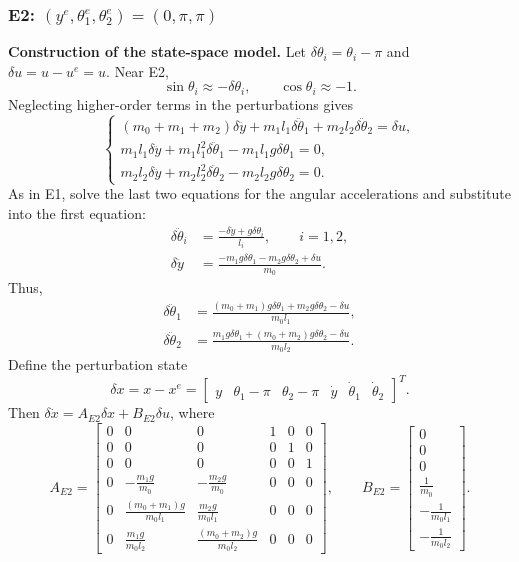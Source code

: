 \documentclass[12pt,a4paper]{article}
\begin{document}
\subsubsection*{E2: $(y^e,\theta_1^e,\theta_2^e)=(0,\pi,\pi)$}
\textbf{Construction of the state-space model.}
Let $\delta\theta_i=\theta_i-\pi$ and $\delta u=u-u^e=u$.
Near E2,
\[
\sin\theta_i\approx-\delta\theta_i,\qquad
\cos\theta_i\approx-1.
\]
Neglecting higher-order terms in the perturbations gives
\[
\begin{cases}
(m_0+m_1+m_2)\delta\ddot y
 +m_1l_1\delta\ddot\theta_1+m_2l_2\delta\ddot\theta_2=\delta u,\\
m_1l_1\delta\ddot y+m_1l_1^2\delta\ddot\theta_1
 -m_1l_1g\delta\theta_1=0,\\
m_2l_2\delta\ddot y+m_2l_2^2\delta\ddot\theta_2
 -m_2l_2g\delta\theta_2=0.
\end{cases}
\]
As in E1, solve the last two equations for the angular accelerations
and substitute into the first equation:
\begin{align*}
\delta\ddot\theta_i&=\frac{-\delta\ddot y+g\delta\theta_i}{l_i},
\qquad i=1,2,\\
\delta\ddot y&=\frac{-m_1g\delta\theta_1-m_2g\delta\theta_2+\delta u}{m_0}.
\end{align*}
Thus,
\begin{align*}
\delta\ddot\theta_1
 &=\frac{(m_0+m_1)g\delta\theta_1+m_2g\delta\theta_2-\delta u}{m_0l_1},\\
\delta\ddot\theta_2
 &=\frac{m_1g\delta\theta_1+(m_0+m_2)g\delta\theta_2-\delta u}{m_0l_2}.
\end{align*}
Define the perturbation state
\[
\delta x=x-x^e=
\begin{bmatrix}
y&\theta_1-\pi&\theta_2-\pi&\dot y&\dot\theta_1&\dot\theta_2
\end{bmatrix}^{T}.
\]
Then $\delta\dot x=A_{E2}\delta x+B_{E2}\delta u$, where
\[
A_{E2}=\begin{bmatrix}
0&0&0&1&0&0\\
0&0&0&0&1&0\\
0&0&0&0&0&1\\
0&-\frac{m_1g}{m_0}&-\frac{m_2g}{m_0}&0&0&0\\
0&\frac{(m_0+m_1)g}{m_0l_1}&\frac{m_2g}{m_0l_1}&0&0&0\\
0&\frac{m_1g}{m_0l_2}&\frac{(m_0+m_2)g}{m_0l_2}&0&0&0
\end{bmatrix},
\qquad
B_{E2}=\begin{bmatrix}
0\\0\\0\\\frac{1}{m_0}\\-\frac{1}{m_0l_1}\\-\frac{1}{m_0l_2}
\end{bmatrix}.
\]
\end{document}
